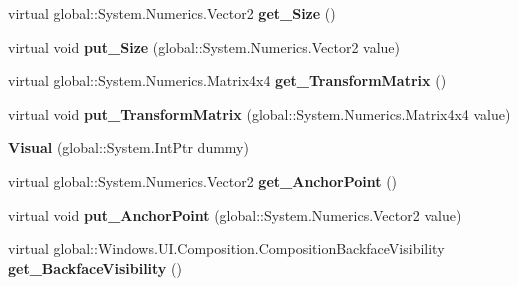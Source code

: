 \begin{DoxyCompactItemize}
\item 
\mbox{\label{class_windows_1_1_u_i_1_1_composition_1_1_visual_aac55aa21f6e472aab4a33831d9e4ea2a}} 
virtual global\+::\+System.\+Numerics.\+Vector2 {\bfseries get\+\_\+\+Size} ()
\item 
\mbox{\label{class_windows_1_1_u_i_1_1_composition_1_1_visual_a00b77bc75500670531a48399d03ffe1d}} 
virtual void {\bfseries put\+\_\+\+Size} (global\+::\+System.\+Numerics.\+Vector2 value)
\item 
\mbox{\label{class_windows_1_1_u_i_1_1_composition_1_1_visual_a8c23adab99bc95b5ccbf93a75ed76265}} 
virtual global\+::\+System.\+Numerics.\+Matrix4x4 {\bfseries get\+\_\+\+Transform\+Matrix} ()
\item 
\mbox{\label{class_windows_1_1_u_i_1_1_composition_1_1_visual_a2689ab7c32a3c7a5d1978aa89a514762}} 
virtual void {\bfseries put\+\_\+\+Transform\+Matrix} (global\+::\+System.\+Numerics.\+Matrix4x4 value)
\item 
\mbox{\label{class_windows_1_1_u_i_1_1_composition_1_1_visual_ae752ab49085c6766890dc632d053d6e8}} 
{\bfseries Visual} (global\+::\+System.\+Int\+Ptr dummy)
\item 
\mbox{\label{class_windows_1_1_u_i_1_1_composition_1_1_visual_a5c51998e94ec1776d9b212fef7f643c6}} 
virtual global\+::\+System.\+Numerics.\+Vector2 {\bfseries get\+\_\+\+Anchor\+Point} ()
\item 
\mbox{\label{class_windows_1_1_u_i_1_1_composition_1_1_visual_aa1b0464e36040159979a9f686b078861}} 
virtual void {\bfseries put\+\_\+\+Anchor\+Point} (global\+::\+System.\+Numerics.\+Vector2 value)
\item 
\mbox{\label{class_windows_1_1_u_i_1_1_composition_1_1_visual_ab37e8a416eb15adcf52595af082a3080}} 
virtual global\+::\+Windows.\+U\+I.\+Composition.\+Composition\+Backface\+Visibility {\bfseries get\+\_\+\+Backface\+Visibility} ()

\end{DoxyCompactItemize}
